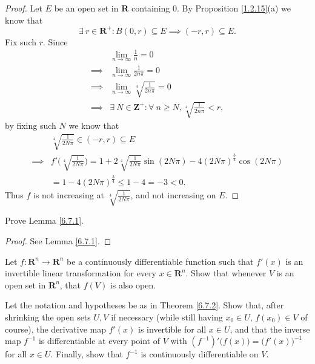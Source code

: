 \begin{proof}
    Let \(E\) be an open set in \(\mathbf{R}\) containing \(0\).
    By Proposition \ref{1.2.15}(a) we know that
    \[
        \exists\ r \in \mathbf{R}^+ : B(0, r) \subseteq E \implies (-r, r) \subseteq E.
    \]
    Fix such \(r\).
    Since
    \begin{align*}
                 & \lim_{n \to \infty} \frac{1}{n} = 0                                               \\
        \implies & \lim_{n \to \infty} \frac{1}{2 n \pi} = 0                                         \\
        \implies & \lim_{n \to \infty} \sqrt[4]{\frac{1}{2 n \pi}} = 0                               \\
        \implies & \exists\ N \in \mathbf{Z}^+ : \forall\ n \geq N, \sqrt[4]{\frac{1}{2 n \pi}} < r,
    \end{align*}
    by fixing such \(N\) we know that
    \begin{align*}
                 & \sqrt[4]{\frac{1}{2 N \pi}} \in (-r, r) \subseteq E                                                                                   \\
        \implies & f'\bigg(\sqrt[4]{\frac{1}{2 N \pi}}\bigg) = 1 + 2 \sqrt[4]{\frac{1}{2 N \pi}} \sin(2 N \pi) - 4 (2 N \pi)^{\frac{3}{4}} \cos(2 N \pi) \\
                 & = 1 - 4 (2 N \pi)^{\frac{3}{4}} \leq 1 - 4 = -3 < 0.
    \end{align*}
    Thus \(f\) is not increasing at \(\sqrt[4]{\frac{1}{2 N \pi}}\), and not increasing on \(E\).
\end{proof}

\begin{exercise}\label{ex 6.7.2}
    Prove Lemma \ref{6.7.1}.
\end{exercise}

\begin{proof}
    See Lemma \ref{6.7.1}.
\end{proof}

\begin{exercise}\label{ex 6.7.3}
    Let \(f : \mathbf{R}^n \to \mathbf{R}^n\) be a continuously differentiable function such that \(f'(x)\) is an invertible linear transformation for every \(x \in \mathbf{R}^n\).
    Show that whenever \(V\) is an open set in \(\mathbf{R}^n\), that \(f(V)\) is also open.
\end{exercise}

\begin{exercise}\label{ex 6.7.4}
    Let the notation and hypotheses be as in Theorem \ref{6.7.2}.
    Show that, after shrinking the open sets \(U, V\) if necessary (while still having \(x_0 \in U\), \(f(x_0) \in V\) of course), the derivative map \(f'(x)\) is invertible for all \(x \in U\), and that the inverse map \(f^{-1}\) is differentiable at every point of \(V\) with \((f^{-1})' \big(f(x)\big) = \big(f'(x)\big)^{-1}\) for all \(x \in U\).
    Finally, show that \(f^{-1}\) is continuously differentiable on \(V\).
\end{exercise}
